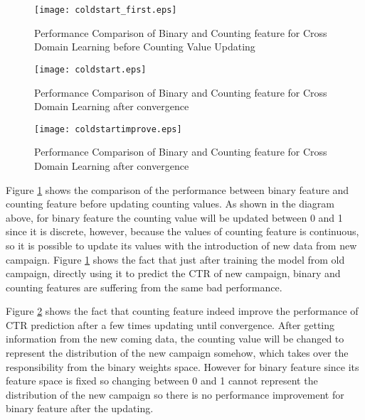 \begin{figure}[t]
\centering
\texttt{[image: coldstart\_first.eps]}
\caption{Performance Comparison of Binary and Counting feature for Cross Domain Learning before Counting Value Updating}
\label{fig:coldstart_first}
\end{figure}

\begin{figure}[t]
\centering
\texttt{[image: coldstart.eps]}
\caption{Performance Comparison of Binary and Counting feature for Cross Domain Learning after convergence}
\label{fig:coldstart}
\end{figure}

\begin{figure}[t]
\centering
\texttt{[image: coldstartimprove.eps]}
\caption{Performance Comparison of Binary and Counting feature for Cross Domain Learning after convergence}
\label{fig:coldstartimprove}
\end{figure}

Figure \ref{fig:coldstart_first} shows the comparison of the performance between binary feature and counting feature before updating counting values. As shown in the diagram above, for binary feature the counting value will be updated between 0 and 1 since it is discrete, however, because the values of counting feature is continuous, so it is possible to update its values with the introduction of new data from new campaign. Figure \ref{fig:coldstart_first} shows the fact that just after training the model from old campaign, directly using it to predict the CTR of new campaign, binary and counting features are suffering from the same bad performance. 

Figure \ref{fig:coldstart} shows the fact that counting feature indeed improve the performance of CTR prediction after a few times updating until convergence. After getting information from the new coming data, the counting value will be changed to represent the distribution of the new campaign somehow, which takes over the responsibility from the binary weights space. However for binary feature since its feature space is fixed so changing between 0 and 1 cannot represent the distribution of the new campaign so there is no performance improvement for binary feature after the updating. 


